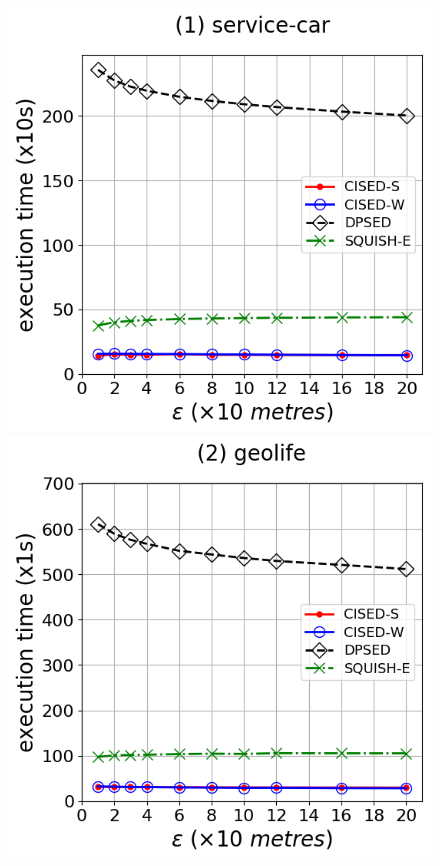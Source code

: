 \begin{figure}[tb!]
\centering
\includegraphics[scale = 0.275]{Figures/Exp-time-epsilon-service.png}\hspace{3ex}
\includegraphics[scale = 0.275]{Figures/Exp-time-epsilon-geolife.png}\hspace{3ex}

\end{figure}
